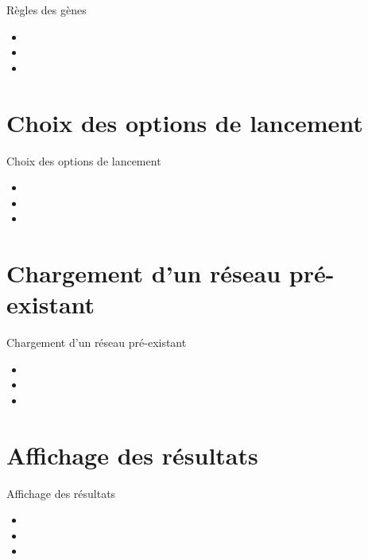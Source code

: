 \documentclass{beamer}
\begin{document}
\begin{frame}{\textcolor{bleu2}{Règles des gènes}}
	\begin{itemize}
	\item 
	\item 
	\item 
	\end{itemize}
\end{frame}

\section{Choix des options de lancement}

\begin{frame}{\textcolor{bleu2}{Choix des options de lancement}}
	\begin{itemize}
	\item 
	\item 
	\item 
	\end{itemize}
\end{frame}

\section{Chargement d'un réseau pré-existant}

\begin{frame}{\textcolor{bleu2}{Chargement d'un réseau pré-existant}}
	\begin{itemize}
	\item 
	\item 
	\item 
	\end{itemize}
\end{frame}

\section{Affichage des résultats}

\begin{frame}{\textcolor{bleu2}{Affichage des résultats}}
	\begin{itemize}
	\item 
	\item 
	\item 
	\end{itemize}
\end{frame}
\end{document}
